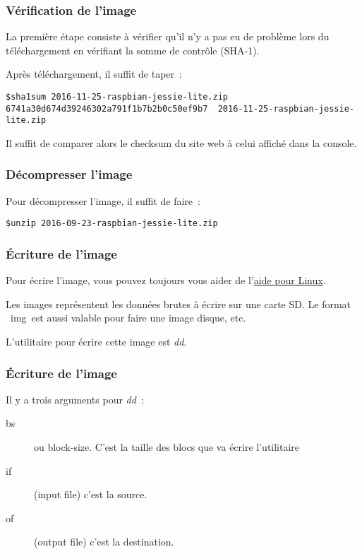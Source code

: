 \begin{frame}[containsverbatim]
\frametitle{Vérification de l'image}
La première étape consiste à vérifier qu'il n'y a pas eu de problème lors du téléchargement en vérifiant la somme de contrôle (SHA-1).

Après téléchargement, il suffit de taper~:
\begin{verbatim}
$sha1sum 2016-11-25-raspbian-jessie-lite.zip 
6741a30d674d39246302a791f1b7b2b0c50ef9b7  2016-11-25-raspbian-jessie-lite.zip
\end{verbatim}

Il suffit de comparer alors le checksum du 	site web à celui affiché dans la console.
\end{frame}

\begin{frame}[containsverbatim]
\frametitle{Décompresser l'image}
Pour décompresser l'image, il suffit de faire~: 

\begin{verbatim}
$unzip 2016-09-23-raspbian-jessie-lite.zip
\end{verbatim}

\end{frame}

\begin{frame}[containsverbatim]
\frametitle{\'Ecriture de l'image}
Pour écrire l'image, vous pouvez toujours vous aider de l'\href{https://www.raspberrypi.org/documentation/installation/installing-images/linux.md}{aide pour Linux}.

Les images représentent les données brutes à écrire sur une carte SD. Le format \og~img~\fg est aussi valable pour faire une image disque, etc.

L'utilitaire pour écrire  cette image est \emph{dd}.
\end{frame}

\begin{frame}[containsverbatim]
\frametitle{\'Ecriture de l'image}

Il y a trois arguments pour \emph{dd}~:
\begin{description}
	\item[bs] ou block-size. C'est la taille des blocs que va écrire l'utilitaire
	\item[if] (input file) c'est la source. 
	\item[of] (output file) c'est la destination. 
\end{description}
\end{frame}

